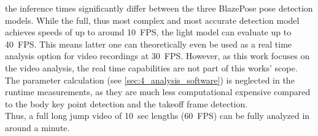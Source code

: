 the inference times significantly differ between the three BlazePose pose
detection models.
While the full, thus most complex and most accurate detection model achieves
speeds of up to around 10~\ac{FPS}, the light model can evaluate up to
40~\ac{FPS}.
This means latter one can theoretically even be used as a real time analysis
option for video recordings at 30~\ac{FPS}.
However, as this work focuses on the video analysis, the real time
capabilities are not part of this works' scope.\\
The parameter calculation (see \autoref*{sec:4_analysis_software}) is
neglected in the runtime measurements, as they are much less computational
expensive compared to the body key point detection and the takeoff frame
detection.\\
Thus, a full long jump video of 10~sec lengths (60~\ac{FPS}) can be fully
analyzed in around a minute.

